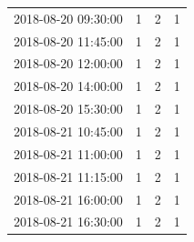 \begin{tabular}{lrrr}
2018-08-20 09:30:00 & 1 & 2 & 1 \\
2018-08-20 11:45:00 & 1 & 2 & 1 \\
2018-08-20 12:00:00 & 1 & 2 & 1 \\
2018-08-20 14:00:00 & 1 & 2 & 1 \\
2018-08-20 15:30:00 & 1 & 2 & 1 \\
2018-08-21 10:45:00 & 1 & 2 & 1 \\
2018-08-21 11:00:00 & 1 & 2 & 1 \\
2018-08-21 11:15:00 & 1 & 2 & 1 \\
2018-08-21 16:00:00 & 1 & 2 & 1 \\
2018-08-21 16:30:00 & 1 & 2 & 1 \\
\bottomrule
\end{tabular}
